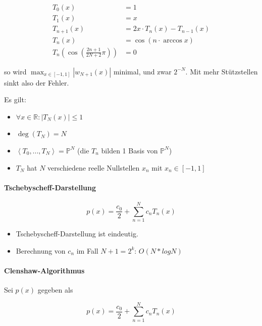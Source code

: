 \documentclass[a4paper, 14pt]{article}
\begin{document}
	\begin{align}
		T_0(x)       & = 1 \\
		T_1(x)       & = x \\
		T_{n + 1}(x) & = 2x \cdot T_n(x) - T_{n - 1}(x) \\
		T_n(x)       & = \cos(n \cdot \arccos{x}) \\
		T_n(\cos{\left( \frac{2n + 1}{2N + 2} \pi \right)})       & = 0
	\end{align}

	so wird $\max_{x \in [-1, 1]}{|w_{N + 1}(x)|}$ minimal, und zwar $2^{-N}$.
	Mit mehr Stützstellen sinkt also der Fehler.

	Es gilt:
	
	\begin{itemize}
		\item $\forall x \in \mathbb{R} : |T_N(x)| \leq 1$
		\item $\deg(T_N) = N$
		\item $\left< T_0, ..., T_N \right> = \mathbb{P}^N$ (die $T_n$ bilden 1 Basis von $\mathbb{P}^N$)
		\item $T_N$ hat $N$ verschiedene reelle Nullstellen $x_n$ mit $x_n \in [-1, 1]$
	\end{itemize}

	\paragraph{Tschebyscheff-Darstellung}

	\begin{equation}
		p(x) = \frac{c_0}{2} + \sum_{n = 1}^{N}{c_n T_n(x)}
	\end{equation}

	\begin{itemize}
		\item Tschebyscheff-Darstellung ist eindeutig.
		\item Berechnung von $c_n$ im Fall $N + 1 = 2^k$: $O(N * log N)$
	\end{itemize}

	\paragraph{Clenshaw-Algorithmus}

	Sei $p(x)$ gegeben als

	\begin{equation}
		p(x) = \frac{c_0}{2} + \sum_{n = 1}^{N}{c_n T_n(x)}
	\end{equation}
\end{document}
